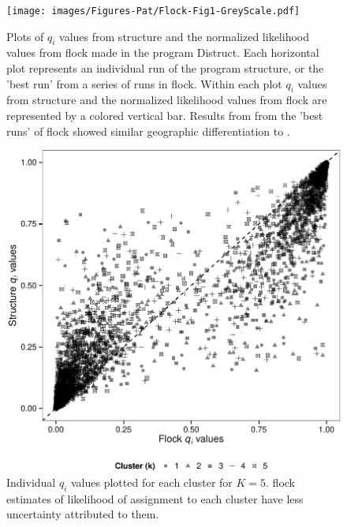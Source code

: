 \begin{figure}
\begin{center}
    \texttt{[image: images/Figures-Pat/Flock-Fig1-GreyScale.pdf]} %
    \caption{Plots of $q_i$ values from {\sc structure} and the normalized likelihood values 
from {\sc flock} made in the program Distruct. Each horizontal plot represents an individual run of the program {\sc structure}, or the 'best run' from a series of runs in {\sc flock}. Within each plot 
$q_i$ values from {\sc structure} and the normalized likelihood values 
from {\sc flock}  are represented by a 
colored vertical bar.  Results from 
from the 'best runs' of {\sc flock} showed similar geographic differentiation to 
\citet{Garzaetal_norcal}.}
    \label{fig:qplots}
\end{center}
\end{figure}


\begin{figure}
\begin{center}
 \includegraphics[width=\columnwidth]{images/Figures-Pat/Fig2.pdf}
    \caption{Individual \textit{$q_i$} values plotted for each cluster for $K=5$. 
{\sc flock} estimates of likelihood of assignment to each cluster have less uncertainty
 attributed to them.}
    \label{fig:qscatter}
\end{center}
\end{figure}

